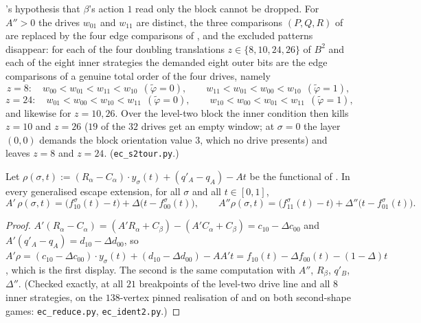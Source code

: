 \begin{corollary}[\Cref{thm:escape-no-beta} is sharp: the second shape revives $z=24,26$]%
\label{cor:ec-no-beta-fails}
's hypothesis that $\beta$'s action $1$ read only the block cannot be
dropped. For $A''>0$ the drives $w_{01}$ and $w_{11}$ are distinct, the three comparisons
$(P,Q,R)$ of  are replaced by the four edge comparisons of
, and the excluded patterns disappear: for each of the four doubling
translations $z\in\{8,10,24,26\}$ of $B^{2}$ and each of the eight inner strategies the demanded
eight outer bits are the edge comparisons of a genuine total order of the four drives, namely
\[
 z=8:\quad w_{00}<w_{01}<w_{11}<w_{10}\ \ (\tilde\varphi=0),\qquad
           w_{11}<w_{01}<w_{00}<w_{10}\ \ (\tilde\varphi=1),
\]
\[
 z=24:\quad w_{01}<w_{00}<w_{10}<w_{11}\ \ (\tilde\varphi=0),\qquad
            w_{10}<w_{00}<w_{01}<w_{11}\ \ (\tilde\varphi=1),
\]
and likewise for $z=10,26$. Over the level-two block the inner condition then kills $z=10$ and
$z=26$ ($19$ of the $32$ drives get an empty window; at $\sigma=0$ the layer $(0,0)$ demands the
block orientation value $3$, which no drive presents) and leaves $z=8$ and $z=24$.
(\texttt{ec\_s2tour.py}.)
\end{corollary}

\begin{theorem}\label{thm:ec-identity}
Let $\rho(\sigma,t):=(R_\alpha-C_\alpha)\cdot y_\sigma(t)+(q'_A-q_A)-At$ be the functional of
. In every generalised escape extension, for all $\sigma$ and all
$t\in[0,1]$,
\[
 A'\,\rho(\sigma,t)=\bigl(f^\sigma_{10}(t)-t\bigr)+\Delta\bigl(t-f^\sigma_{00}(t)\bigr),
 \qquad
 A''\rho(\sigma,t)=\bigl(f^\sigma_{11}(t)-t\bigr)+\Delta''\bigl(t-f^\sigma_{01}(t)\bigr).
\]
\end{theorem}

\begin{proof}
$A'(R_\alpha-C_\alpha)=(A'R_\alpha+C_\beta)-(A'C_\alpha+C_\beta)=c_{10}-\Delta c_{00}$ and
$A'(q'_A-q_A)=d_{10}-\Delta d_{00}$, so
$A'\rho=(c_{10}-\Delta c_{00})\cdot y_\sigma(t)+(d_{10}-\Delta d_{00})-AA't
 =f_{10}(t)-\Delta f_{00}(t)-(1-\Delta)t$, which is the first display. The second is the same
computation with $A''$, $R_\beta$, $q'_B$, $\Delta''$. (Checked exactly, at all $21$ breakpoints
of the level-two drive line and all $8$ inner strategies, on the $138$-vertex pinned realisation
of  and on both second-shape games: \texttt{ec\_reduce.py},
\texttt{ec\_ident2.py}.)
\end{proof}

